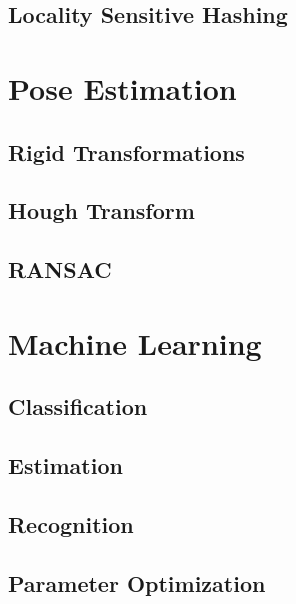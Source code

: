 \subsection{Locality Sensitive Hashing}

\section{Pose Estimation}

\subsection{Rigid Transformations}

\subsection{Hough Transform}

\subsection{RANSAC}


\section{Machine Learning}

\subsection{Classification}

\subsection{Estimation}

\subsection{Recognition}

\subsection{Parameter Optimization}


